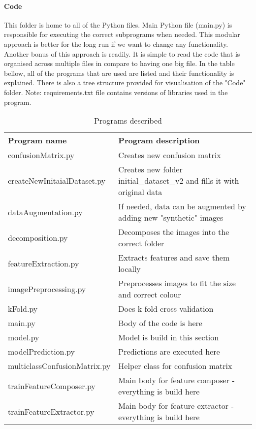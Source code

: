 \paragraph{Code}

This folder is home to all of the Python files. Main Python file (main.py) is responsible for executing the correct subprograms when needed. This modular approach is  better for the long run if we want to change any functionality. Another bonus of this approach is readily. It is simple to read the code that is organised across multiple files in compare to having one big file.
\newline
In the table bellow, all of the programs that are used are listed and their functionality is explained. There is also a tree structure provided for visualisation of the "Code" folder.
\newline
Note: requirements.txt file contains versions of libraries used in the program.
\begin{table}[!ht]
  \centering
    \begin{tabular}{ |m{13em}|m{19em}| } 
     \hline
        Program name & Program description \\ 
     \hline
        confusionMatrix.py & Creates new confusion matrix \\
     \hline
        createNewInitaialDataset.py & Creates new folder initial{\_}dataset{\_}v2 and fills it with original data \\
     \hline
        dataAugmentation.py & If needed, data can be augmented by adding new "synthetic" images \\
     \hline
        decomposition.py & Decomposes the images into the correct folder \\
     \hline
        featureExtraction.py & Extracts features and save them locally \\
     \hline
        imagePreprocessing.py & Preprocesses images to fit the size and correct colour \\
     \hline
        kFold.py & Does k fold cross validation \\
     \hline
        main.py & Body of the code is here \\
     \hline
        model.py & Model is build in this section \\
     \hline
        modelPrediction.py & Predictions are executed here \\
     \hline
        multiclassConfusionMatrix.py & Helper class for confusion matrix \\
     \hline
        trainFeatureComposer.py & Main body for feature composer - everything is build here \\
     \hline
        trainFeatureExtractor.py & Main body for feature extractor - everything is build here \\
     \hline
    \end{tabular}
\caption{Programs described}
\end{table}

